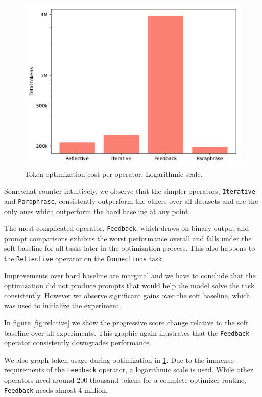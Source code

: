 \begin{figure}
    \includegraphics[width=\linewidth]{usage.pdf}
    \caption{Token optimization cost per operator. Logarithmic scale.}
    \label{fig:usage}
\end{figure}

Somewhat counter-intuitively, we observe that the simpler operators, \texttt{Iterative} and \texttt{Paraphrase},
consistently outperform the others over all datasets and are the only ones which outperform the hard baseline at any point.

The most complicated operator, \texttt{Feedback}, which draws on binary output and prompt comparisons exhibits the
worst performance overall and falls under the soft baseline for all tasks later in the optimization process. This also happens to the
\texttt{Reflective} operator on the \texttt{Connections} task.

Improvements over hard baseline are marginal and we have to conclude that the optimization did not produce 
prompts that would help the model solve the task consistently. However we observe significant gains 
over the soft baseline, which was used to initialize the experiment.

In figure \ref{fig:relative} we show the progressive score change relative to the soft baseline
over all experiments. This graphic again illustrates that the \texttt{Feedback} operator consistently downgrades performance.

We also graph token usage during optimization in \ref{fig:usage}. Due to the immense requirements of
the \texttt{Feedback} operator, a logarithmic scale is used. While other operators need around 200 thousand tokens for a complete optimizer routine,
\texttt{Feedback} needs almost 4 million.


